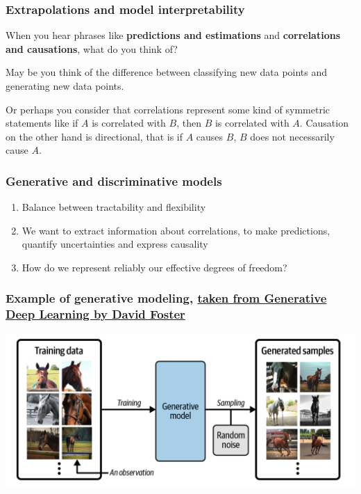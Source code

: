 \documentclass{beamer}
\begin{document}
\begin{frame}
\frametitle{Extrapolations and model interpretability}

When you hear phrases like \textbf{predictions and estimations} and
\textbf{correlations and causations}, what do you think of?

May be you think
of the difference between classifying new data points and generating
new data points.

Or perhaps you consider that correlations represent some kind of symmetric statements like
if $A$ is correlated with $B$, then $B$ is correlated with
$A$. Causation on the other hand is directional, that is if $A$ causes $B$, $B$ does not
necessarily cause $A$.
\end{frame}

\begin{frame}
\frametitle{Generative and discriminative models}

\begin{block}{}
\begin{enumerate}
\item Balance between tractability and flexibility

\item We want to extract information about correlations, to make predictions, quantify uncertainties and express causality

\item How do we represent reliably our effective degrees of freedom?
\end{enumerate}

\noindent
\end{block}
\end{frame}

\begin{frame}
\frametitle{Example of generative modeling, \href{{https://www.oreilly.com/library/view/generative-deep-learning/9781098134174/ch01.html}}{taken from Generative Deep Learning by David Foster}}

\vspace{6mm}

\centerline{\includegraphics[width=1.0\linewidth]{figures/generativelearning.png}}

\vspace{6mm}
\end{frame}
\end{document}

